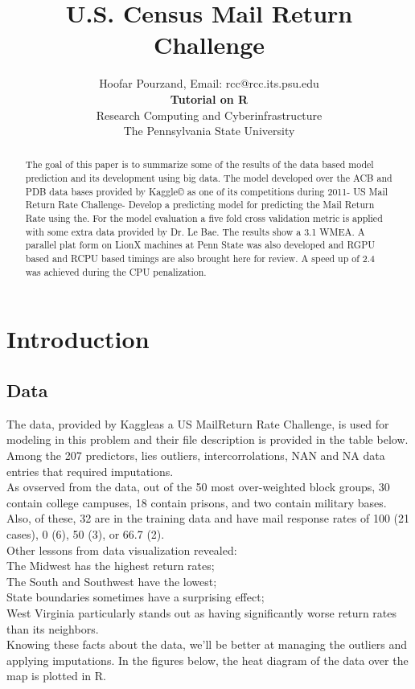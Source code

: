 \documentclass[journal]{/home/hoofar/LatexClasses/IEEEtran}
\begin{document}
\title{U.S. Census Mail Return Challenge}
\author{Hoofar Pourzand, Email: rcc@rcc.its.psu.edu \\
\textbf{Tutorial on R}\\ Research Computing and Cyberinfrastructure\\The Pennsylvania State University }
\maketitle

\begin{abstract}
The goal of this paper is to summarize some of the results of the data based model prediction and its development using big data. The model developed over the ACB and PDB data bases provided by Kaggle© as one of its competitions during 2011- US Mail Return Rate Challenge-
Develop a predicting model for predicting the Mail Return Rate using the. For the model evaluation a five fold cross validation metric is applied with some extra data provided by Dr. Le Bae. The results show a 3.1 WMEA. A parallel plat form on LionX machines at Penn State was also developed and RGPU based and RCPU based timings are also brought here for review. A speed up of 2.4 was achieved during the CPU penalization. 
\end{abstract}

\section*{Introduction}
\subsection*{Data}

The data, provided by Kaggle\texttrademark as a US MailReturn Rate Challenge, is used for modeling in this problem and their file description is provided in the table below.\\ %

Among the 207 predictors, lies outliers, intercorrolations, NAN and NA data entries that required imputations. \\
As ovserved from the data, out of the 50 most over-weighted block groups, 30 contain college campuses, 18 contain prisons, and two contain military bases. Also, of these, 32 are in the training data and have mail response rates of 100 (21 cases), 0 (6), 50 (3), or 66.7 (2).\\ Other lessons from data visualization revealed:\\
The Midwest has the highest return rates;\\
The South and Southwest have the lowest;\\
State boundaries sometimes have a surprising effect;\\
West Virginia particularly stands out as having significantly worse return rates than its neighbors.\\
Knowing these facts about the data, we’ll be better at managing the outliers and applying imputations. In the figures below, the heat diagram of the data over the map is plotted in R.\\
\end{document}
